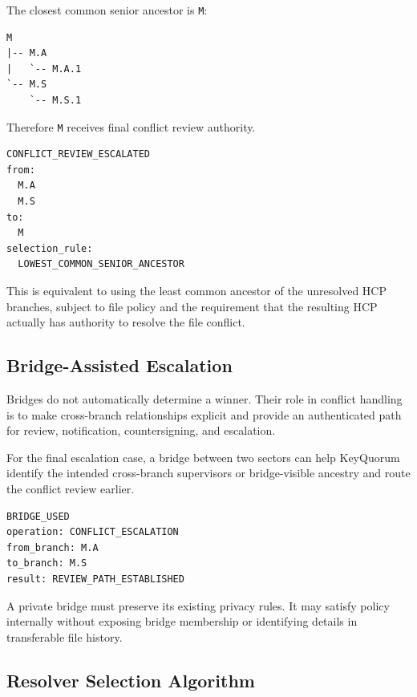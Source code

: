 \documentclass[11pt]{article}
\begin{document}
The closest common senior ancestor is \texttt{M}:

\begin{lstlisting}
M
|-- M.A
|   `-- M.A.1
`-- M.S
    `-- M.S.1
\end{lstlisting}

Therefore \texttt{M} receives final conflict review authority.

\begin{lstlisting}
CONFLICT_REVIEW_ESCALATED
from:
  M.A
  M.S
to:
  M
selection_rule:
  LOWEST_COMMON_SENIOR_ANCESTOR
\end{lstlisting}

This is equivalent to using the least common ancestor of the unresolved HCP branches, subject to file policy and the requirement that the resulting HCP actually has authority to resolve the file conflict.

\subsection{Bridge-Assisted Escalation}

Bridges do not automatically determine a winner. Their role in conflict handling is to make cross-branch relationships explicit and provide an authenticated path for review, notification, countersigning, and escalation.

For the final escalation case, a bridge between two sectors can help KeyQuorum identify the intended cross-branch supervisors or bridge-visible ancestry and route the conflict review earlier.

\begin{lstlisting}
BRIDGE_USED
operation: CONFLICT_ESCALATION
from_branch: M.A
to_branch: M.S
result: REVIEW_PATH_ESTABLISHED
\end{lstlisting}

A private bridge must preserve its existing privacy rules. It may satisfy policy internally without exposing bridge membership or identifying details in transferable file history.

\subsection{Resolver Selection Algorithm}
\end{document}
